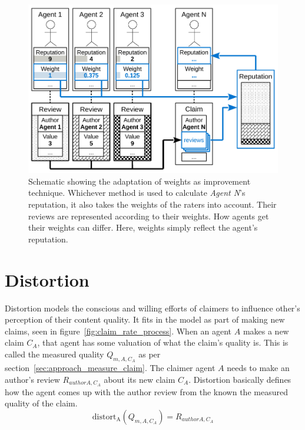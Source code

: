 \documentclass[%
    ]{\PathToTumTemplate/thesis/tum_thesis}
\begin{document}
\begin{figure}[tbp]
  \begin{center}
        \includegraphics[width=1\linewidth]	{../images/improvement_weights-crop.pdf}
    \caption{
    Schematic showing the adaptation of weights as improvement technique.
    Whichever method is used to calculate \emph{Agent N}'s reputation, it also takes the weights of the raters into account.
    Their reviews are represented according to their weights.
    How agents get their weights can differ.
    Here, weights simply reflect the agent's reputation.
    }
    \label{fig:improvement_weights}
  \end{center}
\end{figure}



\section{Distortion}\label{sec:distort_strategies}

Distortion models the conscious and willing efforts of claimers to influence other's perception of their content quality.
It fits in the model as part of making new claims, seen in figure~\ref{fig:claim_rate_process}.
When an agent $A$ makes a new claim $C_A$, that agent has some valuation of what the claim's quality is.
This is called the measured quality $Q_{m,A,C_{A}}$ as per section~\ref{sec:approach_measure_claim}.
The claimer agent $A$ needs to make an author's review $R_{author A, C_{A}}$ about its new claim $C_A$.
Distortion basically defines how the agent comes up with the author review from the known the measured quality of the claim.
\begin{equation}
\mathrm{distort_{A}}(Q_{m,A,C_{A}}) = R_{author A, C_{A}}
\end{equation}
\end{document}
